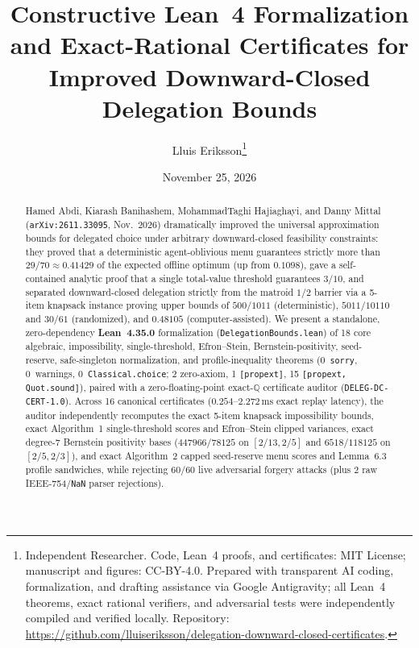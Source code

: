 \documentclass[10pt,twocolumn]{article}
\title{\vspace{-1.0em}\textbf{Constructive Lean~4 Formalization and Exact-Rational Certificates for Improved Downward-Closed Delegation Bounds}}
\author{Lluis Eriksson\thanks{Independent Researcher. Code, Lean~4 proofs, and certificates: MIT License; manuscript and figures: CC-BY-4.0. Prepared with transparent AI coding, formalization, and drafting assistance via Google Antigravity; all Lean~4 theorems, exact rational verifiers, and adversarial tests were independently compiled and verified locally. Repository: \url{https://github.com/lluiseriksson/delegation-downward-closed-certificates}.}}
\date{November 25, 2026}
\newcommand{\QQ}{\mathbb{Q}}
\begin{document}
\maketitle
\vspace{-1.3em}

\begin{abstract}
Hamed Abdi, Kiarash Banihashem, MohammadTaghi Hajiaghayi, and Danny Mittal (\texttt{arXiv:2611.33095}, Nov.\ 2026) dramatically improved the universal approximation bounds for delegated choice under arbitrary downward-closed feasibility constraints: they proved that a deterministic agent-oblivious menu guarantees strictly more than $29/70 \approx 0.41429$ of the expected offline optimum (up from $0.1098$), gave a self-contained analytic proof that a single total-value threshold guarantees $3/10$, and separated downward-closed delegation strictly from the matroid $1/2$ barrier via a 5-item knapsack instance proving upper bounds of $500/1011$ (deterministic), $5011/10110$ and $30/61$ (randomized), and $0.48105$ (computer-assisted). We present a standalone, zero-dependency \textbf{Lean~4.35.0} formalization (\texttt{DelegationBounds.lean}) of 18 core algebraic, impossibility, single-threshold, Efron--Stein, Bernstein-positivity, seed-reserve, safe-singleton normalization, and profile-inequality theorems (0~\texttt{sorry}, 0~warnings, 0~\texttt{Classical.choice}; 2 zero-axiom, 1 \texttt{[propext]}, 15 \texttt{[propext, Quot.sound]}), paired with a zero-floating-point exact-$\QQ$ certificate auditor (\texttt{DELEG-DC-CERT-1.0}). Across 16 canonical certificates ($0.254$--$2.272\,\mathrm{ms}$ exact replay latency), the auditor independently recomputes the exact 5-item knapsack impossibility bounds, exact Algorithm~1 single-threshold scores and Efron--Stein clipped variances, exact degree-7 Bernstein positivity bases ($447966/78125$ on $[2/13,2/5]$ and $6518/118125$ on $[2/5,2/3]$), and exact Algorithm~2 capped seed-reserve menu scores and Lemma~6.3 profile sandwiches, while rejecting 60/60 live adversarial forgery attacks (plus 2 raw IEEE-754/\texttt{NaN} parser rejections).
\end{abstract}
\end{document}
